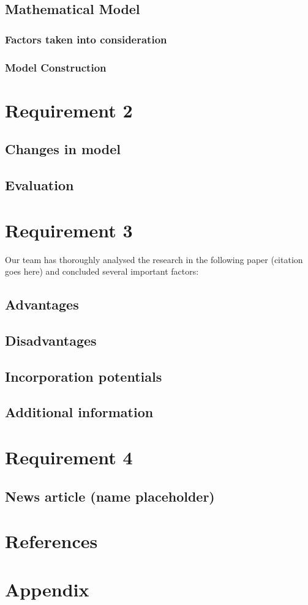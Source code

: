\documentclass[12pt]{article}
\begin{document}
\subsection{Mathematical Model}
\subsubsection{Factors taken into consideration}

\subsubsection{Model Construction}


\section{Requirement 2}
\subsection{Changes in model}

\subsection{Evaluation}


\section{Requirement 3}
Our team has thoroughly analysed the research in the following paper (citation goes here) and concluded several important factors:
\subsection{Advantages}

\subsection{Disadvantages}

\subsection{Incorporation potentials}

\subsection{Additional information}


\section{Requirement 4}
\subsection{News article (name placeholder)}


\section{References}


\section{Appendix}
\end{document}

